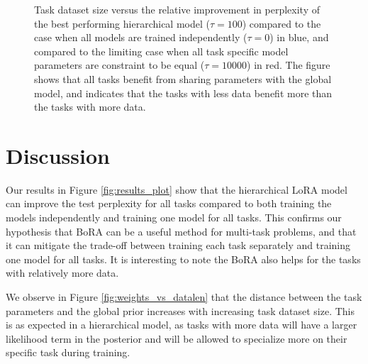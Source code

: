 \documentclass{article}
\begin{document}
\begin{figure}[h]
    \centering
    \caption{Task dataset size versus the relative improvement in perplexity of the best performing hierarchical model ($\tau = 100$) compared to the case when all models are trained independently ($\tau = 0$) in blue, and compared to the limiting case when all task specific model parameters are constraint to be equal ($\tau=10000$) in red. 
    The figure shows that all tasks benefit from sharing parameters with the global model, and indicates that the tasks with less data benefit more than the tasks with more data.}
    \label{fig:relative_improvement}
\end{figure}

\section{Discussion}
Our results in Figure \ref{fig:results_plot} show that the hierarchical LoRA model can improve the test perplexity for all tasks compared to both training the models independently and training one model for all tasks. This confirms our hypothesis that BoRA can be a useful method for multi-task problems, and that it can mitigate the trade-off between training each task separately and training one model for all tasks.
It is interesting to note the BoRA also helps for the tasks with relatively more data.

We observe in Figure \ref{fig:weights_vs_datalen} that the distance between the task parameters and the global prior increases with increasing task dataset size. This is as expected in a hierarchical model, as tasks with more data will have a larger likelihood term in the posterior and will be allowed to specialize more on their specific task during training.
\end{document}
